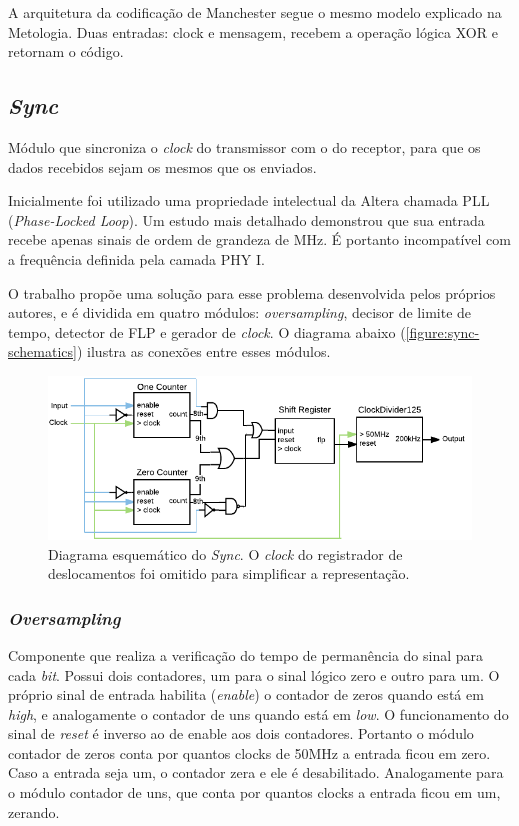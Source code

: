 	A arquitetura da codificação de Manchester segue o mesmo modelo explicado na Metologia. Duas entradas: clock e mensagem, recebem a operação lógica XOR e retornam o código.
	
	
	\subsection{\textit{Sync}}
	
	Módulo que sincroniza o \textit{clock} do transmissor com o do receptor, para que os dados recebidos sejam os mesmos que os enviados. 
	
	Inicialmente foi utilizado uma propriedade intelectual da Altera chamada PLL (\textit{Phase-Locked Loop}). Um estudo mais detalhado demonstrou que sua entrada recebe apenas sinais de ordem de grandeza de MHz. É portanto incompatível com a frequência definida pela camada PHY I.
	
	O trabalho propõe uma solução para esse problema desenvolvida pelos próprios autores, e é dividida em quatro módulos: \textit{oversampling}, decisor de limite de tempo, detector de FLP e gerador de \textit{clock}. O diagrama abaixo (\autoref{figure:sync-schematics}) ilustra as conexões entre esses módulos.
	\begin{figure}[h]
		\caption{\label{figure:sync-schematics}Diagrama esquemático do \textit{Sync}. O \textit{clock} do registrador de deslocamentos foi omitido para simplificar a representação.}
		\centering
		\includegraphics[width=1\textwidth]{sync/schematics.pdf}
	\end{figure}
	
	\subsubsection{\textit{Oversampling}}
	Componente que realiza a verificação do tempo de permanência do sinal para cada \textit{bit}. Possui dois contadores, um para o sinal lógico zero e outro para um. O próprio sinal de entrada habilita (\textit{enable}) o contador de zeros quando está em \textit{high}, e analogamente o contador de uns quando está em \textit{low}. O funcionamento do sinal de \textit{reset} é inverso ao de enable aos dois contadores. Portanto o módulo contador de zeros conta por quantos clocks de 50MHz a entrada ficou em zero. Caso a entrada seja um, o contador zera e ele é desabilitado. Analogamente para o módulo contador de uns, que conta por quantos clocks a entrada ficou em um, zerando.

